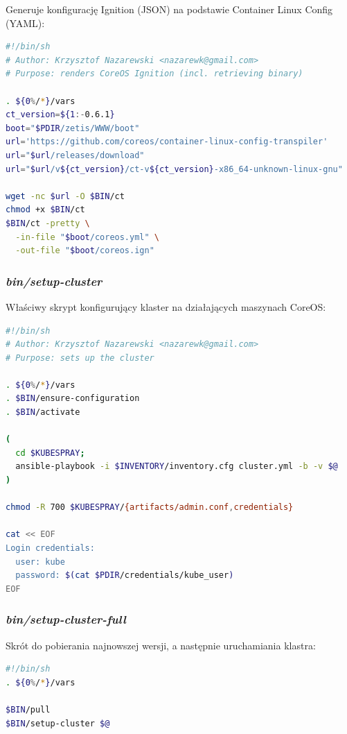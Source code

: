 \documentclass[a4paper,12pt,twoside,openany]{report}
\begin{document}
Generuje konfigurację Ignition (JSON) na podstawie Container Linux
Config (YAML):

\begin{lstlisting}[language=bash]
#!/bin/sh
# Author: Krzysztof Nazarewski <nazarewk@gmail.com>
# Purpose: renders CoreOS Ignition (incl. retrieving binary)

. ${0%/*}/vars
ct_version=${1:-0.6.1}
boot="$PDIR/zetis/WWW/boot"
url='https://github.com/coreos/container-linux-config-transpiler'
url="$url/releases/download"
url="$url/v${ct_version}/ct-v${ct_version}-x86_64-unknown-linux-gnu"

wget -nc $url -O $BIN/ct
chmod +x $BIN/ct
$BIN/ct -pretty \
  -in-file "$boot/coreos.yml" \
  -out-file "$boot/coreos.ign"
\end{lstlisting}

\newpage

\hypertarget{binsetup-cluster}{%
\subsubsection{\texorpdfstring{\emph{bin/setup-cluster}}{bin/setup-cluster}}\label{binsetup-cluster}}

Właściwy skrypt konfigurujący klaster na działających maszynach CoreOS:

\begin{lstlisting}[language=bash]
#!/bin/sh
# Author: Krzysztof Nazarewski <nazarewk@gmail.com>
# Purpose: sets up the cluster

. ${0%/*}/vars
. $BIN/ensure-configuration
. $BIN/activate

(
  cd $KUBESPRAY;
  ansible-playbook -i $INVENTORY/inventory.cfg cluster.yml -b -v $@
)

chmod -R 700 $KUBESPRAY/{artifacts/admin.conf,credentials}

cat << EOF
Login credentials:
  user: kube
  password: $(cat $PDIR/credentials/kube_user)
EOF
\end{lstlisting}

\hypertarget{binsetup-cluster-full}{%
\subsubsection{\texorpdfstring{\emph{bin/setup-cluster-full}}{bin/setup-cluster-full}}\label{binsetup-cluster-full}}

Skrót do pobierania najnowszej wersji, a następnie uruchamiania klastra:

\begin{lstlisting}[language=bash]
#!/bin/sh
. ${0%/*}/vars

$BIN/pull
$BIN/setup-cluster $@
\end{lstlisting}
\end{document}
